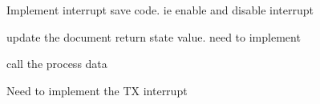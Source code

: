 
\begin{DoxyRefList}
\item[\label{todo__todo000001}%
\hypertarget{todo__todo000001}{}%
Member \hyperlink{_f_i_f_o_8h_a1fe07979ab19f7405a4b5bedbdc26a07}{F\-I\-F\-O\-\_\-\-Counnter\-Buffer\-Count} (void)]Implement interrupt save code. ie enable and disable interrupt  
\item[\label{todo__todo000005}%
\hypertarget{todo__todo000005}{}%
Member \hyperlink{_terminal_8h_a8939cfce56b8f95a2a322c973190204e}{Terminal\-\_\-\-Process} (void)]update the document return state value. need to implement 

call the process data  
\item[\label{todo__todo000002}%
\hypertarget{todo__todo000002}{}%
Member \hyperlink{usart2_8c_a0ca6fd0e6f77921dd1123539857ba0a8}{U\-S\-A\-R\-T2\-\_\-\-I\-R\-Q\-Handler} (void)]Need to implement the T\-X interrupt 
\end{DoxyRefList}